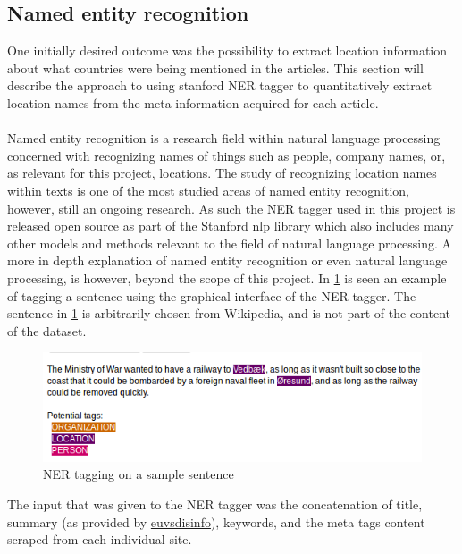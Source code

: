 \documentclass{article}
\begin{document}
\subsection{Named entity recognition}
One initially desired outcome was the possibility to extract location information about what countries were being mentioned in the articles. This section will describe the approach to using stanford NER tagger to quantitatively extract location names from the meta information acquired for each article.
\\\\
Named entity recognition is a research field within natural language processing concerned with recognizing names of things such as people, company names, or, as relevant for this project, locations. The study of recognizing location names within texts is one of the most studied areas of named entity recognition, however, still an ongoing research. As such the NER tagger used in this project is released open source as part of the Stanford nlp library\cite{manning-EtAl:2014:P14-5} which also includes many other models and methods relevant to the field of natural language processing. 
A more in depth explanation of named entity recognition or even natural language processing, is however, beyond the scope of this project. 
In \cref{fig:ner_tagging} is seen an example of tagging a sentence using the graphical interface of the NER tagger. The sentence in \cref{fig:ner_tagging} is arbitrarily chosen from Wikipedia, and is not part of the content of the dataset.

\begin{figure}[H]
\caption{NER tagging on a sample sentence}
\label{fig:ner_tagging}
\includegraphics[width=\textwidth]{images/sample_tagging.png}
\end{figure}

The input that was given to the NER tagger was the concatenation of title, summary (as provided by \url{euvsdisinfo}), keywords, and the meta tags content scraped from each individual site.
\end{document}
